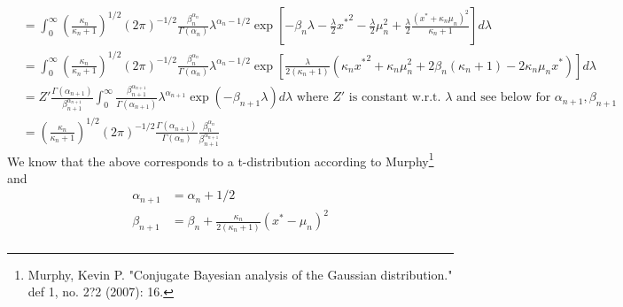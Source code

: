 \documentclass[twoside]{homework}
\begin{document}
\begin{align*}
&= \int_{0}^{\infty} \left( \frac{\kappa_n }{\kappa_n + 1} \right)^{1/2} (2 \pi)^{-1/2} \frac{\beta_n^{\alpha_n}}{\Gamma(\alpha_n)} \lambda^{\alpha_n -1/2}  \exp \left[-\beta_n \lambda - \frac{\lambda}{2} {x^{*}}^2 - \frac{\lambda}{2} \mu_n^2 + \frac{\lambda}{2} \frac{(x^{*} + \kappa_n \mu_n)^2}{\kappa_n +1} \right] d\lambda \\
&= \int_{0}^{\infty} \left( \frac{\kappa_n }{\kappa_n + 1} \right)^{1/2} (2 \pi)^{-1/2} \frac{\beta_n^{\alpha_n}}{\Gamma(\alpha_n)} \lambda^{\alpha_n -1/2} \exp \left[ \frac{\lambda}{2(\kappa_n + 1)} (\kappa_n {x^{*}}^2 + \kappa_n \mu_n^2  + 2 \beta_n(\kappa_n + 1) -  2\kappa_n \mu_n x^{*}) \right] d\lambda \\
&= Z' \frac{\Gamma(\alpha_{n + 1})}{\beta_{n + 1}^{\alpha_{n +1}}} \int_{0}^{\infty} \frac{\beta_{n + 1}^{\alpha_{n +1}}}{\Gamma(\alpha_{n + 1})} \lambda^{\alpha_{n +1}} \exp(- \beta_{n + 1}\lambda) d\lambda \textrm { where } Z' \textrm{ is constant w.r.t. } \lambda \textrm{ and see below for } \alpha_{n + 1}, \beta_{n + 1}\\
&= \left( \frac{\kappa_n }{\kappa_n + 1} \right)^{1/2} (2 \pi)^{-1/2} \frac{\Gamma(\alpha_{n + 1})}{\Gamma(\alpha_n)} \frac{\beta_n^{\alpha_n}}{\beta_{n + 1}^{\alpha_{n +1}}} 
\end{align*}
We know that the above corresponds to a t-distribution according to Murphy\footnote{Murphy, Kevin P. "Conjugate Bayesian analysis of the Gaussian distribution." def 1, no. 2?2 (2007): 16.} and
\begin{align*}
\alpha_{n + 1} &= \alpha_n + 1/2 \\
\beta_{n + 1} &=  \beta_n + \frac{\kappa_n}{2(\kappa_n + 1)} (x^{*} - \mu_n)^2  \\
\end{align*}
\end{document}

